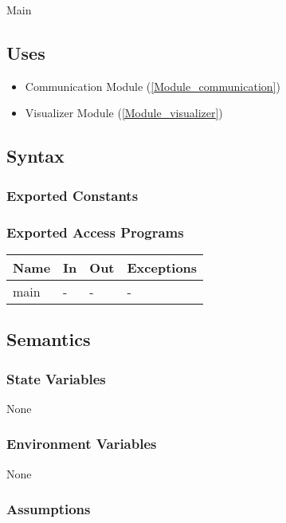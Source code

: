 \documentclass[12pt, titlepage]{article}
\begin{document}
Main

\subsection{Uses}

\begin{itemize}
  \item Communication Module (\ref{Module_communication})
  \item Visualizer Module (\ref{Module_visualizer})
\end{itemize}

\subsection{Syntax}

\subsubsection{Exported Constants}

\subsubsection{Exported Access Programs}

\begin{center}
\begin{tabular}{p{2cm} p{4cm} p{4cm} p{2cm}}
\hline
\textbf{Name} & \textbf{In} & \textbf{Out} & \textbf{Exceptions} \\
\hline
main & - & - & - \\
\hline
\end{tabular}
\end{center}

\subsection{Semantics}

\subsubsection{State Variables}

None

\subsubsection{Environment Variables}

None

\subsubsection{Assumptions}
\end{document}
